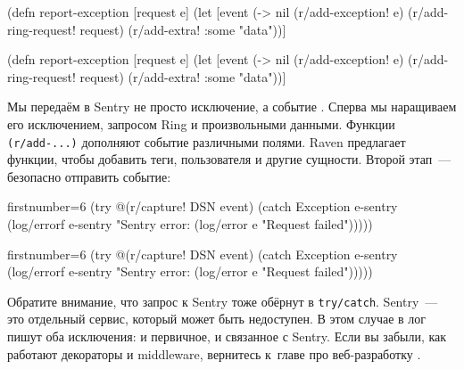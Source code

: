 \ifnarrow

\begin{english}
  \begin{clojure/lines}
(defn report-exception [request e]
 (let
   [event
    (-> nil
     (r/add-exception! e)
     (r/add-ring-request! request)
     (r/add-extra! {:some "data"}))]
  \end{clojure/lines}
\end{english}

\else

\begin{english}
  \begin{clojure/lines}
(defn report-exception [request e]
  (let [event (-> nil
                  (r/add-exception! e)
                  (r/add-ring-request! request)
                  (r/add-extra! {:some "data"}))]
  \end{clojure/lines}
\end{english}

\fi

Мы передаём в Sentry не просто исключение, а событие . Сперва мы
наращиваем его исключением, запросом Ring и произвольными данными. Функции
\verb|(r/add-...)| дополняют событие различными полями. Raven предлагает
функции, чтобы добавить теги, пользователя и другие сущности. Второй этап~---
безопасно отправить событие:

\ifnarrow

\begin{english}
  \begin{clojure/lines*}{firstnumber=6}
(try
  @(r/capture! DSN event)
  (catch Exception e-sentry
    (log/errorf
      e-sentry "Sentry error: %
    (log/error e "Request failed")))))
  \end{clojure/lines*}
\end{english}

\else

\begin{english}
  \begin{clojure/lines*}{firstnumber=6}
    (try
      @(r/capture! DSN event)
      (catch Exception e-sentry
        (log/errorf e-sentry "Sentry error: %
        (log/error e "Request failed")))))
  \end{clojure/lines*}
\end{english}

\fi

Обратите внимание, что запрос к Sentry тоже обёрнут в \verb|try/catch|. Sentry~---
это отдельный сервис, который может быть недоступен. В этом случае в лог пишут
оба исключения: и первичное, и связанное с Sentry. Если вы забыли, как работают
декораторы и middleware, вернитесь к~главе про веб-разработку .

